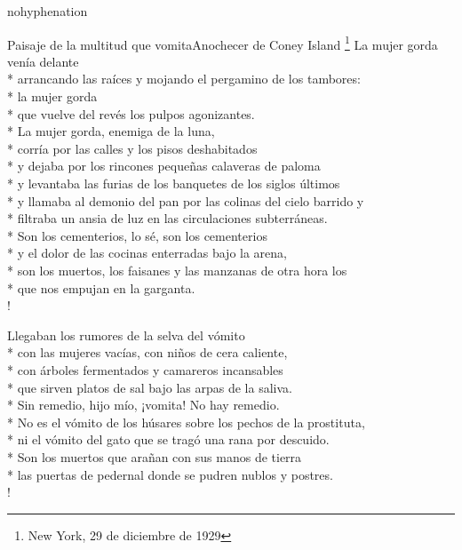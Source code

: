 \documentclass[
    a5paper,
    DIV=10,
    12pt,
    notitlepage,
    oneside,]
{scrbook} %
\begin{document}
\begin{hyphenrules}{nohyphenation}
\begin{poem}{Paisaje de la multitud que vomita}{Anochecer de Coney Island \footnote{New York, 29 de diciembre de 1929}}{}
La mujer gorda venía delante\\*
arrancando las raíces y mojando el pergamino de los tambores:\\*
la mujer gorda\\*
que vuelve del revés los pulpos agonizantes.\\*
La mujer gorda, enemiga de la luna,\\*
corría por las calles y los pisos deshabitados\\*
y dejaba por los rincones pequeñas calaveras de paloma\\*
y levantaba las furias de los banquetes de los siglos últimos\\*
y llamaba al demonio del pan por las colinas del cielo barrido y\\*
filtraba un ansia de luz en las circulaciones subterráneas.\\*
Son los cementerios, lo sé, son los cementerios\\*
y el dolor de las cocinas enterradas bajo la arena,\\*
son los muertos, los faisanes y las manzanas de otra hora los\\*
que nos empujan en la garganta.\\!

Llegaban los rumores de la selva del vómito\\*
con las mujeres vacías, con niños de cera caliente,\\*
con árboles fermentados y camareros incansables\\*
que sirven platos de sal bajo las arpas de la saliva.\\*
Sin remedio, hijo mío, ¡vomita! No hay remedio.\\*
No es el vómito de los húsares sobre los pechos de la prostituta,\\*
ni el vómito del gato que se tragó una rana por descuido.\\*
Son los muertos que arañan con sus manos de tierra\\*
las puertas de pedernal donde se pudren nublos y postres.\\!


\end{poem}
\end{hyphenrules}
\end{document}
